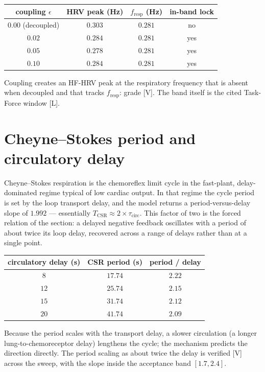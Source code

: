 \documentclass[11pt]{article}
\newcommand{\grade}[1]{\textsf{\small[#1]}}
\begin{document}
\begin{center}
\begin{tabular}{@{}cccc@{}}
\toprule
coupling $\epsilon$ & HRV peak (Hz) & $f_{\mathrm{resp}}$ (Hz) & in-band lock\\
\midrule
$0.00$ (decoupled) & $0.303$ & $0.281$ & no\\
$0.02$ & $0.284$ & $0.281$ & yes\\
$0.05$ & $0.278$ & $0.281$ & yes\\
$0.10$ & $0.284$ & $0.281$ & yes\\
\bottomrule
\end{tabular}
\end{center}

\noindent
Coupling creates an HF-HRV peak at the respiratory frequency that is absent when decoupled and that
tracks $f_{\mathrm{resp}}$: grade \grade{V}. The band itself is the cited Task-Force window \grade{L}.

\section{Cheyne--Stokes period and circulatory delay}

Cheyne--Stokes respiration is the chemoreflex limit cycle in the fast-plant, delay-dominated regime
typical of low cardiac output. In that regime the cycle period is set by the loop transport delay, and
the model returns a period-versus-delay slope of $1.992$ --- essentially $T_{\mathrm{CSR}}\approx
2\times\tau_{\mathrm{circ}}$. This factor of two is the forced relation of the section: a delayed
negative feedback oscillates with a period of about twice its loop delay, recovered across a range of
delays rather than at a single point.

\begin{center}
\begin{tabular}{@{}ccc@{}}
\toprule
circulatory delay (s) & CSR period (s) & period / delay\\
\midrule
$8$ & $17.74$ & $2.22$\\
$12$ & $25.74$ & $2.15$\\
$15$ & $31.74$ & $2.12$\\
$20$ & $41.74$ & $2.09$\\
\bottomrule
\end{tabular}
\end{center}

\noindent
Because the period scales with the transport delay, a slower circulation (a longer
lung-to-chemoreceptor delay) lengthens the cycle; the mechanism predicts the direction directly. The
period scaling as about twice the delay is verified \grade{V} across the sweep, with the slope inside
the acceptance band $[1.7,2.4]$.
\end{document}
